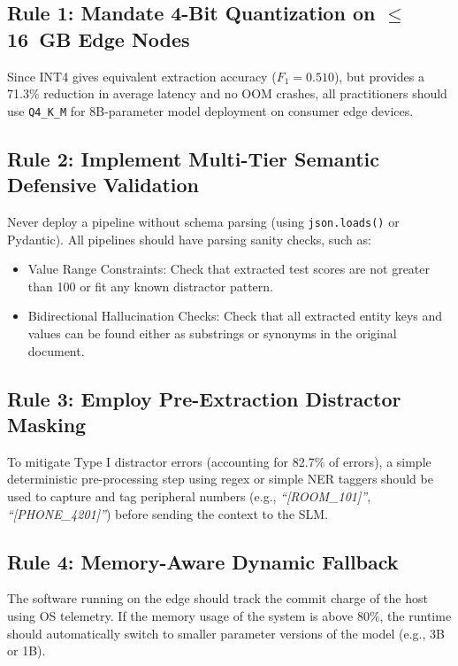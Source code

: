 \documentclass[conference]{IEEEtran}
\begin{document}
{\subsection{Rule 1: Mandate 4-Bit Quantization on $\le$16~GB Edge Nodes}
Since INT4 gives equivalent extraction accuracy ($F_1 = 0.510$), but provides a 71.3\% reduction in average latency and no OOM crashes, all practitioners should use \texttt{Q4\_K\_M} for 8B-parameter model deployment on consumer edge devices.

\subsection{Rule 2: Implement Multi-Tier Semantic Defensive Validation}
Never deploy a pipeline without schema parsing (using \texttt{json.loads()} or Pydantic). All pipelines should have parsing sanity checks, such as:
\begin{itemize}
    \item Value Range Constraints: Check that extracted test scores are not greater than 100 or fit any known distractor pattern.
    \item Bidirectional Hallucination Checks: Check that all extracted entity keys and values can be found either as substrings or synonyms in the original document.
\end{itemize}

\subsection{Rule 3: Employ Pre-Extraction Distractor Masking}
To mitigate Type I distractor errors (accounting for 82.7\% of errors), a simple deterministic pre-processing step using regex or simple NER taggers should be used to capture and tag peripheral numbers (e.g., \textit{``[ROOM\_101]''}, \textit{``[PHONE\_4201]''}) before sending the context to the SLM.

\subsection{Rule 4: Memory-Aware Dynamic Fallback}
The software running on the edge should track the commit charge of the host using OS telemetry. If the memory usage of the system is above 80\%, the runtime should automatically switch to smaller parameter versions of the model (e.g., 3B or 1B).


}
\end{document}
